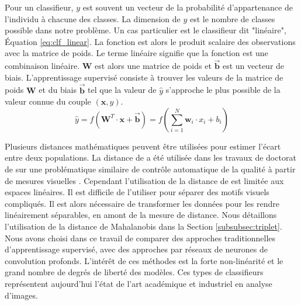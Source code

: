Pour un classifieur, $y$ est souvent un vecteur de la probabilité d'appartenance de l'individu à chacune des classes.
La dimension de $y$ est le nombre de classes possible dans notre problème.
Un cas particulier est le classifieur dit "linéaire", Équation \ref{eq:clf_linear}.
La fonction est alors le produit scalaire des observations avec la matrice de poids.
Le terme linéaire signifie que la fonction est une combinaison linéaire.
$\mathbf{W}$ est alors une matrice de poids et $\vec{\mathbf{b}}$ est un vecteur de biais.
L'apprentissage supervisé consiste à trouver les valeurs de la matrice de poids $\mathbf{W}$ et du biais $\vec{\mathbf{b}}$ tel que la valeur de $\hat{y}$ s'approche le plus possible de la valeur connue du couple $(\mathbf{x}, y)$.
\begin{equation} \label{eq:clf_linear}
\hat{y} = f\left(\mathbf{W}^{T} \cdot \mathbf{x} + \vec{\mathbf{b}}\right) = f\left(\sum_{i=1}^{N} \mathbf{w}_{i} \cdot x_{i} + b_{i}\right)
\end{equation}

Plusieurs distances mathématiques peuvent être utilisées pour estimer l'écart entre deux populations.
La distance de \citeauthor{mahalanobis_generalised_1936} \cite{mahalanobis_generalised_1936} a été utilisée dans les travaux de doctorat de \citeauthor{lacombe_exploitation_2018a} sur une problématique similaire de contrôle automatique de la qualité à partir de mesures visuelles \cite{lacombe_exploitation_2018a}.
Cependant l'utilisation de la distance de \citeauthor{mahalanobis_generalised_1936} est limitée aux espaces linéaires.
Il est difficile de l'utiliser pour séparer des motifs visuels compliqués.
Il est alors nécessaire de transformer les données pour les rendre linéairement séparables, en amont de la mesure de distance.
Nous détaillons l'utilisation de la distance de Mahalanobis dans la Section \ref{subsubsec:triplet}.
Nous avons choisi dans ce travail de comparer des approches traditionnelles d'apprentissage supervisé, avec des approches par réseaux de neurones de convolution profonds.
L'intérêt de ces méthodes est la forte non-linéarité et le grand nombre de degrés de liberté des modèles.
Ces types de classifieurs représentent aujourd'hui l'état de l'art académique et industriel en analyse d'images.

